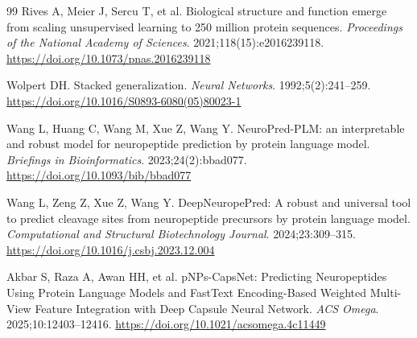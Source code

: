 \documentclass[11pt]{article}
\begin{document}
\begin{thebibliography}{99}
 Rives A, Meier J, Sercu T, et al. Biological structure and function emerge from scaling unsupervised learning to 250 million protein sequences. \textit{Proceedings of the National Academy of Sciences}. 2021;118(15):e2016239118. \url{https://doi.org/10.1073/pnas.2016239118}

 Wolpert DH. Stacked generalization. \textit{Neural Networks}. 1992;5(2):241--259. \url{https://doi.org/10.1016/S0893-6080(05)80023-1}

 Wang L, Huang C, Wang M, Xue Z, Wang Y. NeuroPred-PLM: an interpretable and robust model for neuropeptide prediction by protein language model. \textit{Briefings in Bioinformatics}. 2023;24(2):bbad077. \url{https://doi.org/10.1093/bib/bbad077}

 Wang L, Zeng Z, Xue Z, Wang Y. DeepNeuropePred: A robust and universal tool to predict cleavage sites from neuropeptide precursors by protein language model. \textit{Computational and Structural Biotechnology Journal}. 2024;23:309--315. \url{https://doi.org/10.1016/j.csbj.2023.12.004}

 Akbar S, Raza A, Awan HH, et al. pNPs-CapsNet: Predicting Neuropeptides Using Protein Language Models and FastText Encoding-Based Weighted Multi-View Feature Integration with Deep Capsule Neural Network. \textit{ACS Omega}. 2025;10:12403--12416. \url{https://doi.org/10.1021/acsomega.4c11449}
\end{thebibliography}
\end{document}
